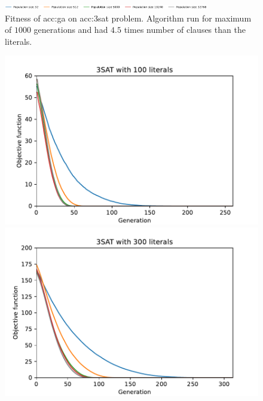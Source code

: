 \begin{figure}[ht!]
    \begin{minipage}{\textwidth}
        \centering
        \includegraphics[width=0.8\textwidth]{img/runs/fitness_ga_3SAT_legend.pdf}
    \end{minipage}

    \caption[Fitness of genetic algorithm]{Fitness of \acrlong{acc:ga} on \acrshort{acc:3sat} problem. Algorithm run for maximum of $1000$ generations and had $4.5$ times number of clauses than the literals.}
\end{figure}

\begin{figure}[ht!]
    \begin{minipage}[t]{0.32\textwidth}
        \centering
        \includegraphics[width=\textwidth]{img/runs/fitness_ga_elitism_3SAT_d100.pdf}
    \end{minipage}
    \hfill
    \begin{minipage}[t]{0.32\textwidth}
        \centering
        \includegraphics[width=\textwidth]{img/runs/fitness_ga_elitism_3SAT_d300.pdf}

\end{minipage}
\end{figure}
